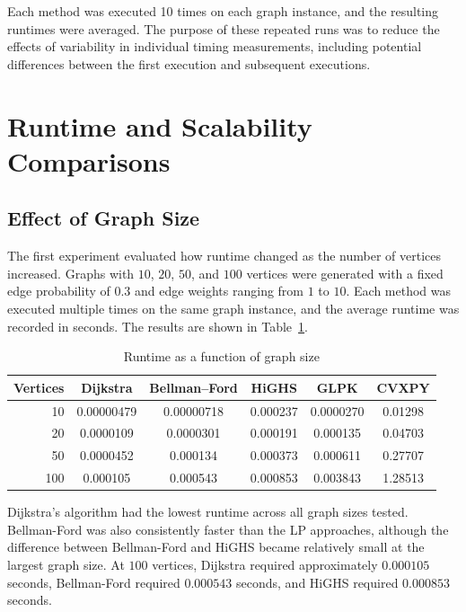 \documentclass[12pt]{report}
\begin{document}
Each method was executed 10 times on each graph instance, and the resulting runtimes were averaged. The purpose of these repeated runs was to reduce the effects of variability in individual timing measurements, including potential differences between the first execution and subsequent executions. 

\section{Runtime and Scalability Comparisons}

\subsection{Effect of Graph Size} 

The first experiment evaluated how runtime changed as the number of vertices increased. Graphs with $10$, $20$, $50$, and $100$ vertices were generated with a fixed edge probability of $0.3$ and edge weights ranging from $1$ to $10$. Each method was executed multiple times on the same graph instance, and the average runtime was recorded in seconds. The results are shown in Table~\ref{tab:size_runtime}.

\begin{table}[H]
\centering
\caption{Runtime as a function of graph size}
\label{tab:size_runtime}
\begin{tabular}{rccccc}
\hline
\textbf{Vertices} & \textbf{Dijkstra} & \textbf{Bellman--Ford} &
\textbf{HiGHS} & \textbf{GLPK} & \textbf{CVXPY} \\
\hline
10  & 0.00000479 & 0.00000718 & 0.000237 & 0.0000270 & 0.01298 \\
20  & 0.0000109  & 0.0000301  & 0.000191 & 0.000135  & 0.04703 \\
50  & 0.0000452  & 0.000134   & 0.000373 & 0.000611  & 0.27707 \\
100 & 0.000105   & 0.000543   & 0.000853 & 0.003843  & 1.28513 \\
\hline
\end{tabular}
\end{table}

Dijkstra's algorithm had the lowest runtime across all graph sizes tested. Bellman-Ford was also consistently faster than the LP approaches, although the difference between Bellman-Ford and HiGHS became relatively small at the largest graph size. At $100$ vertices, Dijkstra required approximately $0.000105$ seconds, Bellman-Ford required $0.000543$ seconds, and HiGHS required $0.000853$ seconds.
\end{document}
